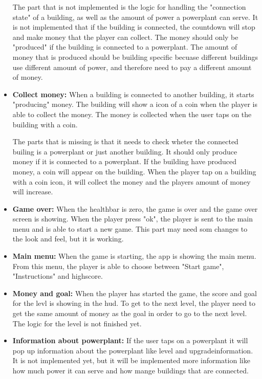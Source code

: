 \begin{itemize}
		The part that is not implemented is the logic for handling the "connection state" of a building, 
		as well as the amount of power a powerplant can serve. It is not implemented that if the building
		is connected, the countdown will stop and make money that the player can collect. The money should
		only be "produced" if the building is connected to a powerplant. The amount of money that is 
		produced should be building specific becuase different buildings use different amount of power, and
		therefore need to pay a different amount of money. 

		\item {\bf Collect money:} When a building is connected to another building, it starts 
		"producing" money. The building will show a icon of a coin when the player is able to 
		collect the money. The money is collected when the user taps on the building with a coin. 

		The parts that is missing is that it needs to check wheter the connected builing is a powerplant 
		or just another building. It should only produce money if it is connected to a powerplant. 
		If the building have produced money, a coin will appear on the building. When the player tap
		on a building with a coin icon, it will collect the money and the players amount of money 
		will increase. 

		\item {\bf Game over:} When the healthbar is zero, the game is over and the game over screen 
		is showing. When the player press "ok", the player is sent to the main menu and is able to 
		start a new game. This part may need som changes to the look and feel, but it is working.

		\item {\bf Main menu:} When the game is starting, the app is showing the main menu. 
		From this menu, the player is able to choose between "Start game", "Instructions" and highscore.

		\item {\bf Money and goal:} When the player has started the game, the score and goal for
		the levl is showing in the hud. To get to the next level, the player need to get the same
		amount of money as the goal in order to go to the next level. The logic for the level
		is not finished yet.

		\item {\bf Information about powerplant:} If the user taps on a powerplant it will pop up
		information about the powerplant like level and upgradeinformation. It is not implemented yet,
		but it will be implemented more information like how much power it can serve and how mange
		buildings that are connected. 


\end{itemize}
